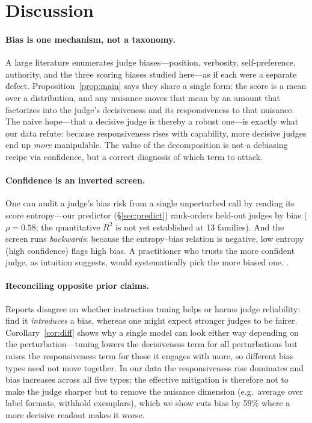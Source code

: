 \documentclass[11pt]{article}
\begin{document}
\section{Discussion}
\paragraph{Bias is one mechanism, not a taxonomy.} A large literature enumerates judge
biases---position, verbosity, self-preference, authority, and the three scoring biases
studied here---as if each were a separate defect. Proposition~\ref{prop:main} says they
share a single form: the score is a mean over a distribution, and any nuisance moves that
mean by an amount that factorizes into the judge's decisiveness and its responsiveness to
that nuisance. The naive hope---that a decisive judge is thereby a robust one---is exactly
what our data refute: because responsiveness rises with capability, more decisive judges
end up \emph{more} manipulable. The value of the decomposition is not a debiasing recipe
via confidence, but a correct diagnosis of which term to attack.

\paragraph{Confidence is an inverted screen.} One can audit a judge's bias risk from a
single unperturbed call by reading its score entropy---our predictor
(\S\ref{sec:predict}) rank-orders held-out judges by bias ($\rho=0.58$; the quantitative
$R^2$ is not yet established at 13 families). And the screen runs \emph{backwards}:
because the entropy--bias relation is negative, low entropy (high confidence) flags
high bias. A
practitioner who trusts the more confident judge, as intuition suggests, would
systematically pick the more biased one. \GOLDSENTENCE{}. \DISCUSSION{}

\paragraph{Reconciling opposite prior claims.} Reports disagree on whether instruction
tuning helps or harms judge reliability: \citet{pan2025user} find it \emph{introduces} a
bias, whereas one might expect stronger judges to be fairer. Corollary~\ref{cor:diff}
shows why a single model can look either way depending on the perturbation---tuning lowers
the decisiveness term for all perturbations but raises the responsiveness term for those
it engages with more, so different bias types need not move together. In our data the
responsiveness rise dominates and bias increases across all five types; the effective
mitigation is therefore not to make the judge sharper but to remove the nuisance
dimension (e.g.\ average over label formats, withhold exemplars), which we show cuts bias
by 59\% where a more decisive readout makes it worse.
\end{document}
